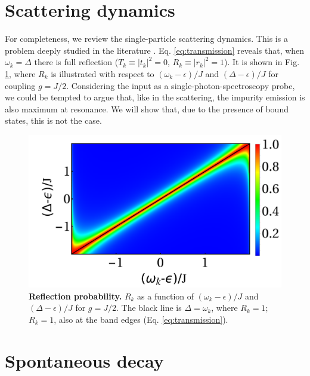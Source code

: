 \documentclass[aps,pra,twocolumn,floatfix,superscriptaddress]{revtex4-1}%
\begin{document}

\section{Scattering dynamics}\label{sec:scatt}
For completeness, we review the single-particle scattering dynamics. This is a problem deeply studied in the literature \cite{Nori2008a, Fan2005a, Fan2005b, Guinea1987,Roy2016}.
Eq. \eqref{eq:transmission} reveals that, 
 when $\omega_k=\Delta$ there is full reflection ($T_k\equiv |t_k|^2=0$, $R_k\equiv |r_k|^2 = 1$). 
It is shown in Fig. \ref{fig:R}, where $R_k$ is illustrated with respect to $(\omega_k-\epsilon)/J$ and $(\Delta-\epsilon)/J$ for coupling $g=J/2$. 
Considering the  input as a single-photon-spectroscopy probe, we could be tempted to argue that, like in the scattering, the impurity emission is also maximum at resonance.  We will show that, due to the presence of bound states, this is not the case. 

\begin{figure}[thb!]
\begin{center}
\includegraphics[width=1.\columnwidth]{R_vs_w_Delta_g_0_5.pdf}
\caption{{\bf Reflection probability.} $R_k$ as a function of $(\omega_k-\epsilon)/J$ and $(\Delta-\epsilon)/J$ for $g=J/2$. The black line is $\Delta=\omega_k$, where $R_k=1$; $R_k=1$, also at the band edges (Eq. \eqref{eq:transmission}).}\label{fig:R}
\end{center}
\end{figure}


\section{Spontaneous decay}\label{sec:spontaneous_decay}
\end{document}
